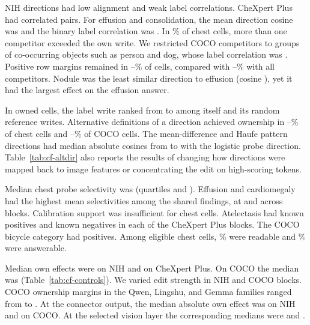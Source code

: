 


NIH directions had low alignment and weak label correlations. CheXpert Plus had correlated pairs. For effusion and consolidation, the mean direction cosine was \cfGeoCosEffCons{} and the binary label correlation was \cfGeoPhiEffCons{}. In \cfGeoTwoAbovePct{}\% of chest cells, more than one competitor exceeded the own write. We restricted COCO competitors to groups of co-occurring objects such as person and dog, whose label correlation was \cfGeoFamPhiPersonDog{}. Positive row margins remained in \cfGeoCocoFamMinPct{}--\cfGeoCocoFamMaxPct{}\% of cells, compared with \cfGeoCocoFamFullMinPct{}--\cfGeoCocoFamFullMaxPct{}\% with all competitors. Nodule was the least similar direction to effusion (cosine \cfSeedCosNodule{}), yet it had the largest effect on the effusion answer.

In owned cells, the label write ranked from \jnOwnedRankMin{} to \jnOwnedRankMax{} among itself and its \jnRandomDirections{} random reference writes. Alternative definitions of a direction achieved ownership in \cfAltdirChestPctMin{}--\cfAltdirChestPctMax{}\% of chest cells and \cfAltdirCocoPctMin{}--\cfAltdirCocoPctMax{}\% of COCO cells. The mean-difference and Haufe pattern directions had median absolute cosines from \cfAltdirCosMin{} to \cfAltdirCosMax{} with the logistic probe direction. Table~\ref{tab:cf-altdir} also reports the results of changing how directions were mapped back to image features or concentrating the edit on high-scoring tokens.

Median chest probe selectivity was \cfSelChestMed{} (quartiles \cfSelChestQOne{} and \cfSelChestQThree{}). Effusion and cardiomegaly had the highest mean selectivities among the shared findings, at \cfSelEffusion{} and \cfSelCardiomegaly{} across \cfChestProbeBlocks{} blocks. Calibration support was insufficient for \cfSupportInelChest{} chest cells. Atelectasis had \cfCalChexInelPos{} known positives and \cfCalChexInelNeg{} known negatives in each of the \cfSupportInelChexBlocks{} CheXpert Plus blocks. The COCO bicycle category had \cfCalCocoInelPos{} positives. Among eligible chest cells, \cfSupportReadablePctChest{}\% were readable and \cfSupportAnswerablePctChest{}\% were answerable.

Median own effects were \cfMedianWqqNih{} on NIH and \cfMedianWqqChex{} on CheXpert Plus. On COCO the median was \cfMedianWqqCoco{} (Table~\ref{tab:cf-controls}). We varied edit strength in \cfDoseBlocksNih{} NIH and \cfDoseBlocksCoco{} COCO blocks. COCO ownership margins in the Qwen, Lingshu, and Gemma families ranged from \cfCocoMarginMin{} to \cfCocoMarginMax{}. At the connector output, the median absolute own effect was \cfConnWqqNih{} on NIH and \cfConnWqqCoco{} on COCO. At the selected vision layer the corresponding medians were \cfPrimWqqNih{} and \cfPrimWqqCoco{}.

